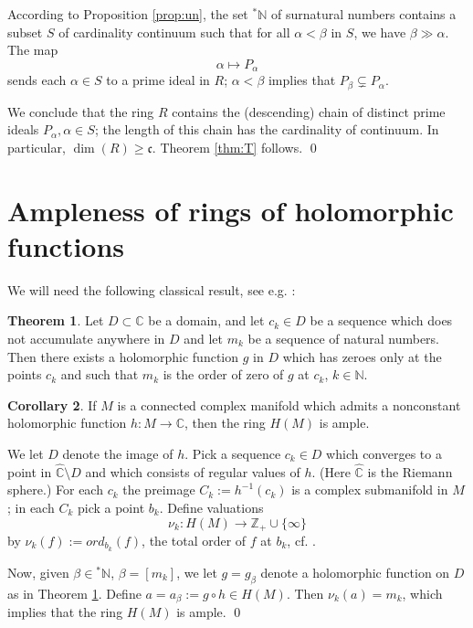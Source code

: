 \documentclass{amsproc}
\theoremstyle{definition}
\newtheorem{theorem}{Theorem}
\theoremstyle{definition}
\newtheorem{corollary}[theorem]{Corollary}
\theoremstyle{remark}
\begin{document}
\medskip
According to Proposition \ref{prop:un}, the set  ${{}^{*}{{\mathbb N}}}$ of surnatural numbers contains a subset $S$ of cardinality continuum such that for all ${\alpha}< {\beta}$ in $S$, we have
${\beta} \gg {\alpha}$. The map
$$
{\alpha}\mapsto P_{\alpha}
$$
sends each ${\alpha}\in S$ to a prime ideal in $R$; ${\alpha}< {\beta}$ implies that $P_{\beta} \subsetneq P_{\alpha}$. 

We conclude that the ring $R$ contains the (descending) chain of distinct prime ideals $P_{\alpha}, {\alpha}\in S$; the length of this chain has the cardinality of continuum.
In particular, $\dim(R)\ge {\mathfrak c}$. Theorem \ref{thm:T} follows. \qed 

\section{Ampleness of rings of holomorphic functions}

\noindent We will need the following classical result, see e.g. \cite[Ch. VII, Theorem 5.15]{Conway}: 

\begin{theorem}\label{thm:W}
Let $D\subset {{\mathbb C}}$ be a domain, and let $c_k\in D$ be a sequence which does not accumulate anywhere in $D$ and let $m_k$ be a sequence of natural numbers. Then there exists a holomorphic function $g$ in $D$ which has zeroes only at the points $c_k$ and such that $m_k$ is the order of zero of $g$ at $c_k$, $k\in {{\mathbb N}}$. 
\end{theorem}

\begin{corollary}\label{cor:main}
If $M$ is a connected complex manifold which admits a nonconstant holomorphic function $h: M\to {{\mathbb C}}$, 
then the ring $H(M)$ is ample. 
\end{corollary}
{\par\medskip{}} We let $D$ denote the image of $h$. Pick a sequence $c_k\in D$ which converges to a point in 
$\hat{{\mathbb C}} \setminus  D$ and which consists of regular values of $h$.  
(Here $\hat{{\mathbb C}}$ is the Riemann sphere.) For each $c_k$ the preimage $C_k:= h^{-1}(c_k)$ 
is a complex submanifold in $M$; in each $C_k$ pick a point $b_k$. Define valuations 
$$\nu_k: H(M)\to {{\mathbb Z}}_+ \cup \{\infty\}$$ 
by $\nu_k(f):= ord_{b_k}(f)$, the total order of $f$ at $b_k$, cf.  \cite[Chapter C, Definition 1]{Gunning}.  

Now, given ${\beta}\in {{}^{*}{{\mathbb N}}}$, ${\beta}=[m_k]$, we let $g=g_{\beta}$ denote a holomorphic function on $D$ as in Theorem 
\ref{thm:W}.   Define $a=a_{\beta}:= g\circ h\in H(M)$. Then 
$\nu_k(a)= m_k$, which implies that the ring $H(M)$ is ample. \qed 
\end{document}
